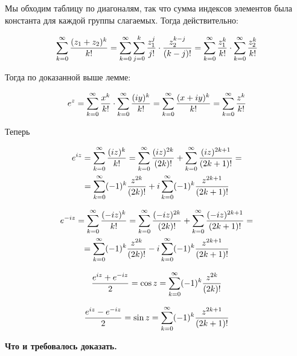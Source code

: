 Мы обходим таблицу по диагоналям, так что сумма индексов элементов была константа для каждой группы слагаемых. Тогда действительно:

$$
\sum^{\infty}_{k = 0} \frac{(z_1 + z_2)^k}{k!} = \sum^{\infty}_{k = 0}  \sum_{j = 0}^k \frac{z_1^j}{j!} \cdot \frac{z_2^{k - j}}{(k - j)!} = \sum^{\infty}_{k = 0} \frac{z_1^k}{k!} \cdot \sum^{\infty}_{k = 0} \frac{z_2^k}{k!}
$$

Тогда по доказанной выше лемме:

$$
e^z = \sum^{\infty}_{k = 0} \frac{x^k}{k!} \cdot \sum^{\infty}_{k = 0} \frac{(iy)^k}{k!} = \sum^{\infty}_{k = 0} \frac{(x + iy)^k}{k!} = \sum^{\infty}_{k = 0} \frac{z^k}{k!}
$$

Теперь 

\begin{multline*}
e^{iz} = \sum^{\infty}_{k = 0} \frac{(iz)^k}{k!} = \sum^{\infty}_{k = 0} \frac{(iz)^{2k}}{(2k)!} + \sum^{\infty}_{k = 0} \frac{(iz)^{2k + 1}}{(2k + 1)!} = \\ = \sum^{\infty}_{k = 0} (-1)^k \frac{z^{2k}}{(2k)!} + i \sum^{\infty}_{k = 0} (-1)^k \frac{z^{2k + 1}}{(2k + 1)!}
\end{multline*}


\begin{multline*}
e^{-iz} = \sum^{\infty}_{k = 0} \frac{(-iz)^k}{k!} = \sum^{\infty}_{k = 0} \frac{(-iz)^{2k}}{(2k)!} + \sum^{\infty}_{k = 0} \frac{(-iz)^{2k + 1}}{(2k + 1)!} = \\ = \sum^{\infty}_{k = 0} (-1)^k \frac{z^{2k}}{(2k)!} - i \sum^{\infty}_{k = 0} (-1)^k \frac{z^{2k + 1}}{(2k + 1)!}
\end{multline*}

$$
\frac{e^{iz} + e^{-iz}}{2} = \cos z = \sum^{\infty}_{k = 0} (-1)^k \frac{z^{2k}}{(2k)!}
$$


$$
\frac{e^{iz} - e^{-iz}}{2} = \sin z = \sum^{\infty}_{k = 0} (-1)^k \frac{z^{2k + 1}}{(2k + 1)!}
$$

\textbf{Что и требовалось доказать.}







